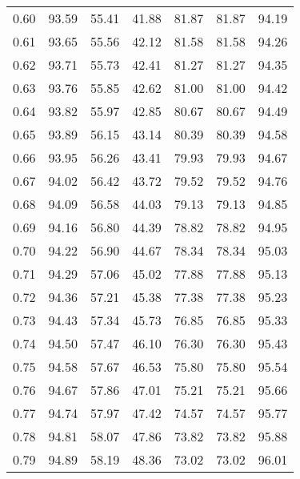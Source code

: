 \begin{tabular}{|c|c|c|c|c|c|c|}
      0.60 &     93.59 &     55.41 &      41.88 &   81.87 &      81.87 &         94.19 \\
      0.61 &     93.65 &     55.56 &      42.12 &   81.58 &      81.58 &         94.26 \\
      0.62 &     93.71 &     55.73 &      42.41 &   81.27 &      81.27 &         94.35 \\
      0.63 &     93.76 &     55.85 &      42.62 &   81.00 &      81.00 &         94.42 \\
      0.64 &     93.82 &     55.97 &      42.85 &   80.67 &      80.67 &         94.49 \\
      0.65 &     93.89 &     56.15 &      43.14 &   80.39 &      80.39 &         94.58 \\
      0.66 &     93.95 &     56.26 &      43.41 &   79.93 &      79.93 &         94.67 \\
      0.67 &     94.02 &     56.42 &      43.72 &   79.52 &      79.52 &         94.76 \\
      0.68 &     94.09 &     56.58 &      44.03 &   79.13 &      79.13 &         94.85 \\
      0.69 &     94.16 &     56.80 &      44.39 &   78.82 &      78.82 &         94.95 \\
      0.70 &     94.22 &     56.90 &      44.67 &   78.34 &      78.34 &         95.03 \\
      0.71 &     94.29 &     57.06 &      45.02 &   77.88 &      77.88 &         95.13 \\
      0.72 &     94.36 &     57.21 &      45.38 &   77.38 &      77.38 &         95.23 \\
      0.73 &     94.43 &     57.34 &      45.73 &   76.85 &      76.85 &         95.33 \\
      0.74 &     94.50 &     57.47 &      46.10 &   76.30 &      76.30 &         95.43 \\
      0.75 &     94.58 &     57.67 &      46.53 &   75.80 &      75.80 &         95.54 \\
      0.76 &     94.67 &     57.86 &      47.01 &   75.21 &      75.21 &         95.66 \\
      0.77 &     94.74 &     57.97 &      47.42 &   74.57 &      74.57 &         95.77 \\
      0.78 &     94.81 &     58.07 &      47.86 &   73.82 &      73.82 &         95.88 \\
      0.79 &     94.89 &     58.19 &      48.36 &   73.02 &      73.02 &         96.01 \\

\end{tabular}
